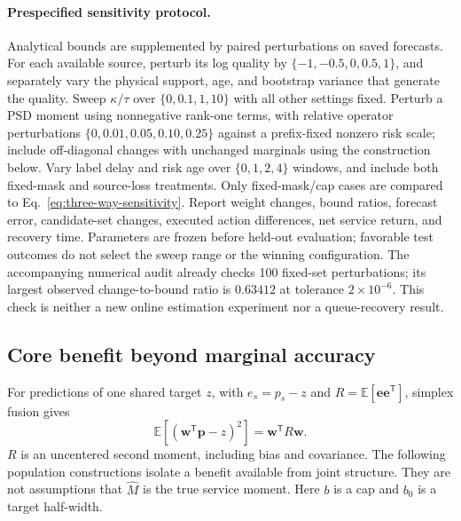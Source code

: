 \documentclass[10pt]{article}
\newcommand{\E}{\mathbb{E}}
\begin{document}
\paragraph{Prespecified sensitivity protocol.}
Analytical bounds are supplemented by paired perturbations on saved forecasts.
For each available source, perturb its log quality by
$\{-1,-0.5,0,0.5,1\}$, and separately vary the physical support, age, and
bootstrap variance that generate the quality. Sweep $\kappa/\tau$ over
$\{0,0.1,1,10\}$ with all other settings fixed. Perturb a PSD moment using
nonnegative rank-one terms, with relative operator perturbations
$\{0,0.01,0.05,0.10,0.25\}$ against a prefix-fixed nonzero risk scale; include
off-diagonal changes with unchanged marginals using the construction below.
Vary label delay and risk age over $\{0,1,2,4\}$ windows, and include both
fixed-mask and source-loss treatments. Only fixed-mask/cap cases are compared
to Eq.~\eqref{eq:three-way-sensitivity}.
Report weight changes, bound ratios, forecast error, candidate-set changes,
executed action differences, net service return, and recovery time. Parameters
are frozen before held-out evaluation; favorable test outcomes do not select
the sweep range or the winning configuration. The accompanying numerical audit
already checks 100 fixed-set perturbations; its largest observed change-to-bound
ratio is $0.63412$ at tolerance $2\times10^{-6}$. This check is neither a new
online estimation experiment nor a queue-recovery result.

\subsection{Core benefit beyond marginal accuracy}
\label{sec:joint-benefit}

For predictions of one shared target $z$, with $e_s=p_s-z$ and
$R=\E[\boldsymbol e\boldsymbol e^{\mathsf T}]$, simplex fusion gives
\begin{equation}
 \E[(\boldsymbol w^{\mathsf T}\boldsymbol p-z)^2]
 =\boldsymbol w^{\mathsf T}R\boldsymbol w.
 \label{eq:joint-risk-identity}
\end{equation}
$R$ is an uncentered second moment, including bias and covariance.
The following population constructions isolate a benefit available from joint
structure. They are not assumptions that $\widehat M$ is the true service moment.
Here $b$ is a cap and $b_0$ is a target half-width.
\end{document}
